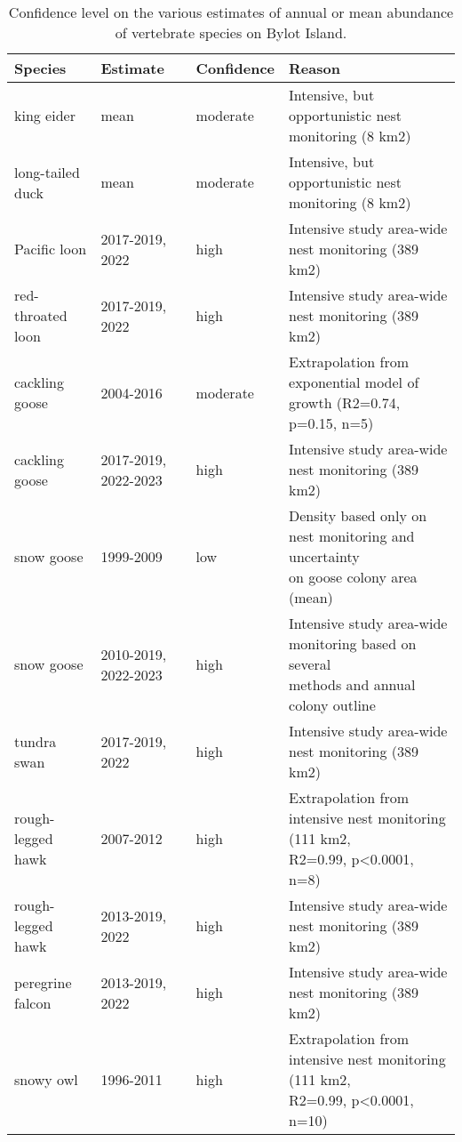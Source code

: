 \begingroup\fontsize{8pt}{10pt}\selectfont
\begin{longtable}{llll}
\caption{Confidence level on the various estimates of annual or mean abundance of vertebrate species on Bylot Island.} \\ 
  \hline
Species & Estimate & Confidence & Reason \\ 
  \hline
king eider & mean & moderate & Intensive, but opportunistic nest monitoring (8 km2) \\ 
  long-tailed duck & mean & moderate & Intensive, but opportunistic nest monitoring (8 km2) \\ 
  Pacific loon & 2017-2019, 2022 & high & Intensive study area-wide nest monitoring (389 km2) \\ 
  red-throated loon & 2017-2019, 2022 & high & Intensive study area-wide nest monitoring (389 km2) \\ 
  cackling goose & 2004-2016 & moderate & \makecell[tl]{Extrapolation from exponential model of growth (R2=0.74,\\p=0.15, n=5)} \\ 
  cackling goose & 2017-2019, 2022-2023 & high & Intensive study area-wide nest monitoring (389 km2) \\ 
  snow goose & 1999-2009 & low & \makecell[tl]{Density based only on nest monitoring and uncertainty\\on goose colony area (mean)} \\ 
  snow goose & 2010-2019, 2022-2023 & high & \makecell[tl]{Intensive study area-wide monitoring based on several\\methods and annual colony outline} \\ 
  tundra swan & 2017-2019, 2022 & high & Intensive study area-wide nest monitoring (389 km2) \\ 
  rough-legged hawk & 2007-2012 & high & \makecell[tl]{Extrapolation from intensive nest monitoring (111 km2,\\R2=0.99, p<0.0001, n=8)} \\ 
  rough-legged hawk & 2013-2019, 2022 & high & Intensive study area-wide nest monitoring (389 km2) \\ 
  peregrine falcon & 2013-2019, 2022 & high & Intensive study area-wide nest monitoring (389 km2) \\ 
  snowy owl & 1996-2011 & high & \makecell[tl]{Extrapolation from intensive nest monitoring (111 km2,\\R2=0.99, p<0.0001, n=10)} \\ 

\end{longtable}
